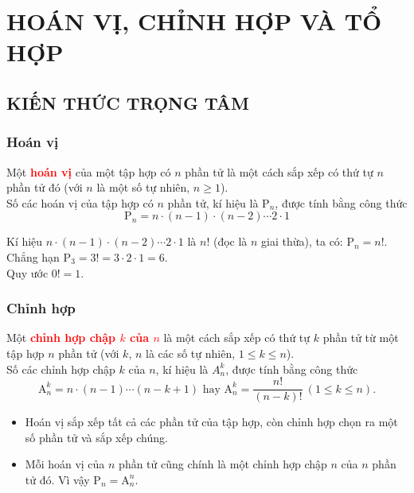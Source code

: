 
\setcounter{section}{23}
\section{HOÁN VỊ, CHỈNH HỢP VÀ TỔ HỢP}
\subsection{KIẾN THỨC TRỌNG TÂM}
\subsubsection{Hoán vị}
\begin{khung4}{}
	Một \textbf{\textcolor{red}{hoán vị}} của một tập hợp có $n$ phần tử là một cách sắp xếp có thứ tự $n$ phần tử đó (với $n$ là một số tự nhiên, $n \geq 1$).
	\\
	Số các hoán vị của tập hợp có $n$ phần tử, kí hiệu là $\mathrm{P}_n$, được tính bằng công thức
	$$\mathrm{P}_n = n \cdot (n - 1) \cdot (n - 2) \cdots 2 \cdot 1$$
\end{khung4}
\begin{note}
	Kí hiệu $n \cdot (n-1) \cdot (n-2) \cdots 2 \cdot 1$ là $n!$ (đọc là $n$ giai thừa), ta có: $\mathrm{P}_n = n!$. Chẳng hạn $\mathrm{P}_3 = 3! = 3 \cdot 2 \cdot 1 = 6$.\\
	Quy ước $0! = 1$.
\end{note}
\subsubsection{Chỉnh hợp}
\begin{khung4}{}
	Một \textbf{\textcolor{red}{chỉnh hợp chập $k$ của $n$}} là một cách sắp xếp có thứ tự $k$ phần tử từ một tập hợp $n$ phần tử (với $k$, $n$ là các số tự nhiên, $1 \le k \le n$).
	\\
	Số các chỉnh hợp chập $k$ của $n$, kí hiệu là $A_n^k$, được tính bằng công thức
	$$\mathrm{A}_n^k = n \cdot (n-1) \cdots (n-k+1) \text{ hay } \mathrm{A}_n^k = \dfrac{n!}{(n-k)!} \ (1 \le k \le n).$$
\end{khung4}
\begin{note}
	\begin{itemize}
		\item Hoán vị sắp xếp tất cả các phần tử của tập hợp, còn chỉnh hợp chọn ra một số phần tử và sắp xếp chúng.
		\item Mỗi hoán vị của $n$ phần tử cũng chính là một chỉnh hợp chập $n$ của $n$ phần tử đó. Vì vậy $\mathrm{P}_n = \mathrm{A}_n^n$.
	\end{itemize}
\end{note}
